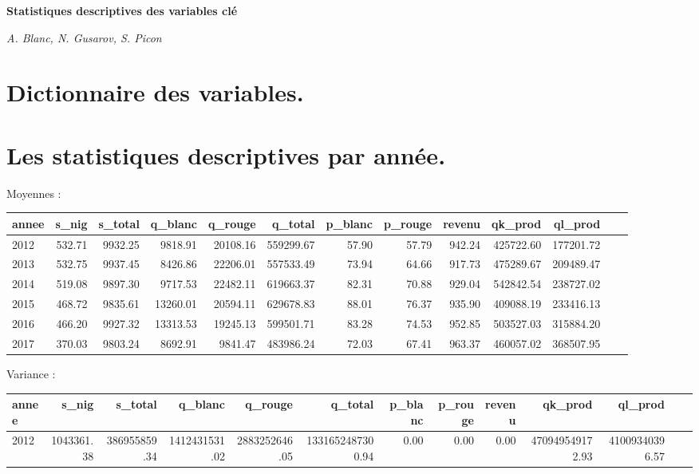 \documentclass[11pt, a4paper]{article}
\begin{document}
\begin{landscape}
\begin{center}
    \Large\textbf{Statistiques descriptives des variables clé}
    \par
    \large\textit{A. Blanc, N. Gusarov, S. Picon}
\end{center}

\section*{Dictionnaire des variables.}

\newpage
\section*{Les statistiques descriptives par année.}
\par
Moyennes :
\FloatBarrier
\hskip-2.0cm
\begin{center}
\begin{tabular}{lrrrrrrrrrrrr}
  \hline
  annee & s\_nig & s\_total & q\_blanc & q\_rouge & q\_total & p\_blanc & p\_rouge & revenu & qk\_prod & ql\_prod \\ 
  \hline
  2012 & 532.71 & 9932.25 & 9818.91 & 20108.16 & 559299.67 & 57.90 & 57.79 & 942.24 & 425722.60 & 177201.72 \\ 
  2013 & 532.75 & 9937.45 & 8426.86 & 22206.01 & 557533.49 & 73.94 & 64.66 & 917.73 & 475289.67 & 209489.47 \\ 
  2014 & 519.08 & 9897.30 & 9717.53 & 22482.11 & 619663.37 & 82.31 & 70.88 & 929.04 & 542842.54 & 238727.02 \\ 
  2015 & 468.72 & 9835.61 & 13260.01 & 20594.11 & 629678.83 & 88.01 & 76.37 & 935.90 & 409088.19 & 233416.13 \\ 
  2016 & 466.20 & 9927.32 & 13313.53 & 19245.13 & 599501.71 & 83.28 & 74.53 & 952.85 & 503527.03 & 315884.20 \\ 
  2017 & 370.03 & 9803.24 & 8692.91 & 9841.47 & 483986.24 & 72.03 & 67.41 & 963.37 & 460057.02 & 368507.95 \\ 
   \hline
\end{tabular} 
\end{center}
\FloatBarrier
Variance :
\FloatBarrier
\hskip-1.0cm\begin{tabular}{lrrrrrrrrrrrr}
    \hline
   annee & s\_nig & s\_total & q\_blanc & q\_rouge & q\_total & p\_blanc & p\_rouge & revenu & qk\_prod & ql\_prod \\
    \hline
    2012 & 1043361.38 & 386955859.34 & 1412431531.02 & 2883252646.05 & 1331652487300.94 & 0.00 & 0.00 & 0.00 & 470949549172.93 & 41009340396.57 \\

\end{tabular}
\end{landscape}
\end{document}

